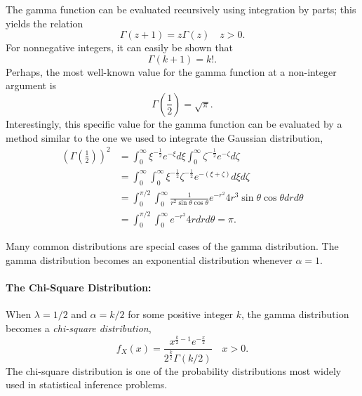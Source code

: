 The gamma function can be evaluated recursively using integration by parts; this yields the relation
\begin{equation*}
\Gamma (z+1) = z \Gamma (z) \quad z > 0.
\end{equation*}
For nonnegative integers, it can easily be shown that
\begin{equation*}
\Gamma (k + 1) = k! .
\end{equation*}
Perhaps, the most well-known value for the gamma function at a non-integer argument is
\begin{equation*}
\Gamma \left( \frac{1}{2} \right)
= \sqrt{\pi} .
\end{equation*}
Interestingly, this specific value for the gamma function can be evaluated by a method similar to the one we used to integrate the Gaussian distribution,
\begin{equation*}
\begin{split}
\left( \Gamma \left( \frac{1}{2} \right) \right)^2
&= \int_0^{\infty} \xi^{-\frac{1}{2}} e^{-\xi} d\xi
\int_0^{\infty} \zeta^{-\frac{1}{2}} e^{-\zeta} d\zeta \\
&= \int_0^{\infty} \int_0^{\infty}
\xi^{-\frac{1}{2}} \zeta^{-\frac{1}{2}} e^{-(\xi + \zeta)}
d\xi d\zeta \\
&= \int_0^{\pi / 2} \int_0^{\infty}
\frac{1}{r^2 \sin \theta \cos \theta} e^{-r^2}
4 r^3 \sin \theta \cos \theta dr d\theta \\
&= \int_0^{\pi / 2} \int_0^{\infty}
 e^{-r^2} 4 r dr d\theta
= \pi .
\end{split}
\end{equation*}

Many common distributions are special cases of the gamma distribution.
The gamma distribution becomes an exponential distribution whenever $\alpha = 1$.


\paragraph{The Chi-Square Distribution:}
When $\lambda = 1/2$ and $\alpha = k/2$ for some positive integer $k$, the gamma distribution becomes a \emph{chi-square distribution},
\begin{equation*}
f_X (x) = \frac{x^{\frac{k}{2} - 1} e^{-\frac{x}{2}}}{2^{\frac{k}{2}}\Gamma (k/2)} \quad  x > 0.
\end{equation*}
The chi-square distribution is one of the probability distributions most widely used in statistical inference problems.


